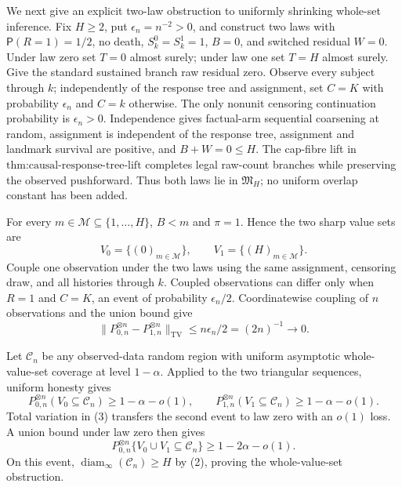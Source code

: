 We next give an explicit two-law obstruction to uniformly shrinking whole-set inference.  Fix \(H\ge2\), put \(\epsilon_n=n^{-2}>0\), and construct two laws with \(\mathsf P(R=1)=1/2\), no death, \(S_k^0=S_k^1=1\), \(B=0\), and switched residual \(W=0\).  Under law zero set \(T=0\) almost surely; under law one set \(T=H\) almost surely.  Give the standard sustained branch raw residual zero.  Observe every subject through \(k\); independently of the response tree and assignment, set \(C=K\) with probability \(\epsilon_n\) and \(C=k\) otherwise.  The only nonunit censoring continuation probability is \(\epsilon_n>0\).  Independence gives factual-arm sequential coarsening at random, assignment is independent of the response tree, assignment and landmark survival are positive, and \(B+W=0\le H\).  The cap-fibre lift in \(\text{thm:causal-response-tree-lift}\) completes legal raw-count branches while preserving the observed pushforward.  Thus both laws lie in \(\mathfrak M_H\); no uniform overlap constant has been added.

For every \(m\in\mathcal M\subseteq\{1,\ldots,H\}\), \(B<m\) and \(\pi=1\).  Hence the two sharp value sets are
\[
 V_0=\{(0)_{m\in\mathcal M}\},\qquad
 V_1=\{(H)_{m\in\mathcal M}\}.                           \tag{2}
\]
Couple one observation under the two laws using the same assignment, censoring draw, and all histories through \(k\).  Coupled observations can differ only when \(R=1\) and \(C=K\), an event of probability \(\epsilon_n/2\).  Coordinatewise coupling of \(n\) observations and the union bound give
\[
 \lVert P_{0,n}^{\otimes n}-P_{1,n}^{\otimes n}\rVert_{\mathrm{TV}}
 \le n\epsilon_n/2=(2n)^{-1}\longrightarrow0.             \tag{3}
\]

Let \(\mathcal C_n\) be any observed-data random region with uniform asymptotic whole-value-set coverage at level \(1-\alpha\).  Applied to the two triangular sequences, uniform honesty gives
\[
 P_{0,n}^{\otimes n}(V_0\subseteq\mathcal C_n)\ge1-\alpha-o(1),\qquad
 P_{1,n}^{\otimes n}(V_1\subseteq\mathcal C_n)\ge1-\alpha-o(1).        \tag{4}
\]
Total variation in (3) transfers the second event to law zero with an \(o(1)\) loss.  A union bound under law zero then gives
\[
 P_{0,n}^{\otimes n}\{V_0\cup V_1\subseteq\mathcal C_n\}
 \ge1-2\alpha-o(1).                                      \tag{5}
\]
On this event, \(\operatorname{diam}_{\infty}(\mathcal C_n)\ge H\) by (2), proving the whole-value-set obstruction.

